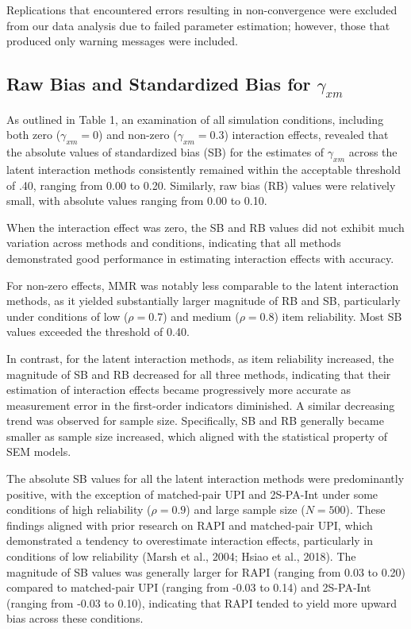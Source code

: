 \documentclass[
  man,mask]{apa6}
\begin{document}
Replications that encountered errors resulting in non-convergence were excluded from our data analysis due to failed parameter estimation; however, those that produced only warning messages were included.

\subsection{\texorpdfstring{Raw Bias and Standardized Bias for \(\gamma_{xm}\)}{Raw Bias and Standardized Bias for \textbackslash gamma\_\{xm\}}}\label{raw-bias-and-standardized-bias-for-gamma_xm}

As outlined in Table 1, an examination of all simulation conditions, including both zero (\(\gamma_{xm} = 0\)) and non-zero (\(\gamma_{xm} = 0.3\)) interaction effects, revealed that the absolute values of standardized bias (SB) for the estimates of \(\gamma_{xm}\) across the latent interaction methods consistently remained within the acceptable threshold of .40, ranging from 0.00 to 0.20. Similarly, raw bias (RB) values were relatively small, with absolute values ranging from 0.00 to 0.10.

When the interaction effect was zero, the SB and RB values did not exhibit much variation across methods and conditions, indicating that all methods demonstrated good performance in estimating interaction effects with accuracy.

For non-zero effects, MMR was notably less comparable to the latent interaction methods, as it yielded substantially larger magnitude of RB and SB, particularly under conditions of low (\(\rho = 0.7\)) and medium (\(\rho = 0.8\)) item reliability. Most SB values exceeded the threshold of 0.40.

In contrast, for the latent interaction methods, as item reliability increased, the magnitude of SB and RB decreased for all three methods, indicating that their estimation of interaction effects became progressively more accurate as measurement error in the first-order indicators diminished. A similar decreasing trend was observed for sample size. Specifically, SB and RB generally became smaller as sample size increased, which aligned with the statistical property of SEM models.

The absolute SB values for all the latent interaction methods were predominantly positive, with the exception of matched-pair UPI and 2S-PA-Int under some conditions of high reliability (\(\rho = 0.9\)) and large sample size (\(\textit{N} = 500\)). These findings aligned with prior research on RAPI and matched-pair UPI, which demonstrated a tendency to overestimate interaction effects, particularly in conditions of low reliability (Marsh et al., 2004; Hsiao et al., 2018). The magnitude of SB values was generally larger for RAPI (ranging from 0.03 to 0.20) compared to matched-pair UPI (ranging from -0.03 to 0.14) and 2S-PA-Int (ranging from -0.03 to 0.10), indicating that RAPI tended to yield more upward bias across these conditions.
\end{document}
